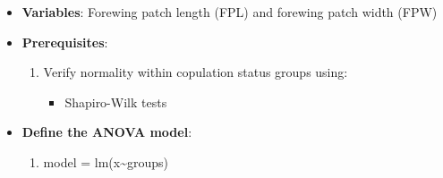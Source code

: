 \documentclass[
]{article}
\providecommand{\tightlist}{%
  \setlength{\itemsep}{0pt}\setlength{\parskip}{0pt}}
\begin{document}
\begin{itemize}
\tightlist
\item
  \textbf{Variables}: Forewing patch length (FPL) and forewing patch
  width (FPW)
\item
  \textbf{Prerequisites}:

  \begin{enumerate}
  \def\labelenumi{\arabic{enumi}.}
  \tightlist
  \item
    Verify normality within copulation status groups using:

    \begin{itemize}
    \tightlist
    \item
      Shapiro-Wilk tests
    \end{itemize}
  \end{enumerate}
\item
  \textbf{Define the ANOVA model}:

  \begin{enumerate}
  \def\labelenumi{\arabic{enumi}.}
  \tightlist
  \item
    model = lm(x\textasciitilde groups)
  \end{enumerate}
\end{itemize}
\end{document}
